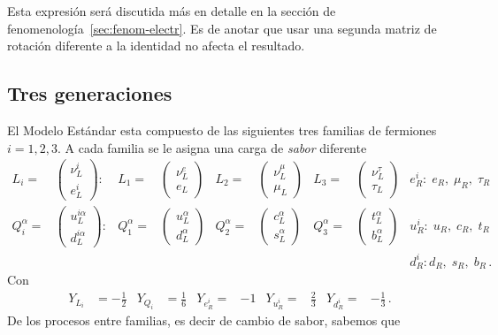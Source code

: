 Esta expresión será discutida más en detalle en la sección de fenomenología~\ref{sec:fenom-electr}. Es de anotar que usar una segunda matriz de rotación diferente a la identidad no afecta el resultado.

\subsection{Tres generaciones}



\begin{frame}
El Modelo Estándar esta compuesto de las siguientes tres familias de fermiones $i=1,2,3$. A cada familia se le asigna una carga de \emph{sabor} diferente
\begin{align}
L_i=&
\begin{pmatrix}
  \nu^i_L\\
  e^i_L
\end{pmatrix}:&
  L_1=&
  \begin{pmatrix}
    \nu^e_L\\
    e_L
  \end{pmatrix}&  L_2=&
  \begin{pmatrix}
    \nu^\mu_L\\
    \mu_L
  \end{pmatrix}&  L_3=&
  \begin{pmatrix}
    \nu^\tau_L\\
    \tau_L
  \end{pmatrix}& e_R^i:\;e_R,\;\mu_R,\;\tau_R\nonumber\\
Q_i^\alpha=&
\begin{pmatrix}
  u^{i\alpha}_L\\
  d^{i\alpha}_L
\end{pmatrix}:&
  Q_1^\alpha=&
  \begin{pmatrix}
    u^\alpha_L\\
    d^\alpha_L
  \end{pmatrix}&  Q_2^\alpha=&
  \begin{pmatrix}
    c^\alpha_L\\
    s^\alpha_L
  \end{pmatrix}&  Q_3^\alpha=&
  \begin{pmatrix}
    t^\alpha_L\\
    b^\alpha_L
  \end{pmatrix}& u_R^i:\;u_R,\;c_R,\;t_R\nonumber\\
&&&&&&&&d_R^i:d_R,\;s_R,\;b_R\,.
\end{align}
Con
\begin{align}
  Y_{L_i}&=-\frac{1}{2}&Y_{Q_i}&=\frac{1}{6}& Y_{e_R^i}=&-1&
Y_{u_R^i}=&\frac{2}{3}&Y_{d_R^i}=&-\frac{1}{3}\,.
\end{align}
De los procesos entre familias, es decir de cambio de sabor, sabemos que


\end{frame}
